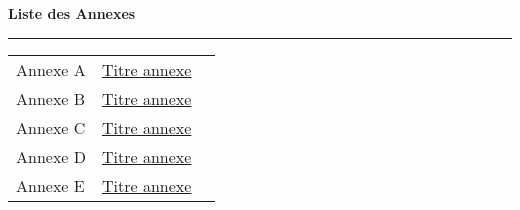 
\Annexes
{}
\renewcommand{\thechapter}{A}
\setcounter{figure}{0}
\renewcommand{\leftmark}{Annexes}
\renewcommand{\rightmark}{Annexes}
  \vspace{15pt}%
  {\Huge {}\selectfont \textbf{Liste des Annexes}}
   \par\nobreak
    \vspace{15pt}
       \hrule
   \vskip20pt
	\normalsize

\begin{tabular}{lp{11.5cm}r}
	Annexe A & \hyperref[annexe-tableoptique]{Titre annexe}  \dotfill& \textbf{\pageref{annexe-tableoptique}}\\
	Annexe B & \hyperref[annex-freqpm]{Titre annexe}  \dotfill& \textbf{\pageref{annex-freqpm}}\\
	Annexe C & \hyperref[annexe-PRL]{Titre annexe}  \dotfill& \textbf{\pageref{annexe-PRL}}\\
	Annexe D & \hyperref[annexe-EPL]{Titre annexe}  \dotfill& \textbf{\pageref{annexe-EPL}}\\
	Annexe E & \hyperref[annexe-seqexptot]{Titre annexe} \dotfill& \textbf{\pageref{annexe-seqexptot}}\\
\end{tabular}

  \EmptyNewPage


{
}

{
}			 			 


{
}

{

}

{

}